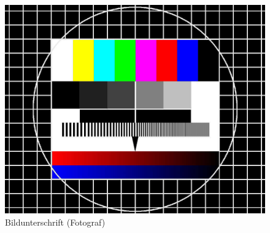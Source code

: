 \begin{figure}[h]
	\centering
	\captionsetup{margin=2.4cm} %
	\includegraphics[width=0.7
	\linewidth]{bilder/identifikation/testbild}
	\caption{Bildunterschrift (Fotograf)}
	\label{fig:testbild}
\end{figure}



